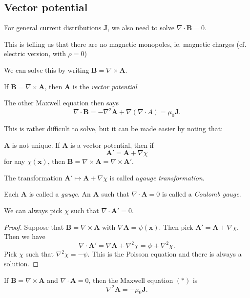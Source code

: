 \documentclass[a4paper]{article}
\begin{document}
\subsection{Vector potential}
For general current distributions $\mathbf{J}$, we also need to solve $\nabla \cdot \mathbf{B} = 0$.

This is telling us that there are no magnetic monopoles, ie. magnetic charges (cf. electric version, with $\rho = 0$)

We can solve this by writing $\mathbf{B} = \nabla \times \mathbf{A}$.
\begin{defi}
  If $\mathbf{B} = \nabla\times \mathbf{A}$, then $\mathbf{A}$ is the \emph{vector potential}.
\end{defi}
The other Maxwell equation then says
\[
  \nabla \cdot \mathbf{B} = -\nabla^2 \mathbf{A} + \nabla(\nabla\cdot A) = \mu_0 \mathbf{J}.\tag{$*$}
\]

This is rather difficult to solve, but it can be made easier by noting that:
\begin{prop}
  $\mathbf{A}$ is not unique. If $\mathbf{A}$ is a vector potential, then if 
  \[
    \mathbf{A}' = \mathbf{A} + \nabla \chi
  \]
  for any $\chi(\mathbf{x})$, then $\mathbf{B} = \nabla \times \mathbf{A} = \nabla\times \mathbf{A}'$.

  The transformation $\mathbf{A}' \mapsto \mathbf{A} + \nabla\chi$ is called a\emph{gauge transformation}.
\end{prop}

\begin{defi}
  Each $\mathbf{A}$ is called a \emph{gauge}. An $\mathbf{A}$ such that $\nabla \cdot \mathbf{A} = 0$ is called a \emph{Coulomb gauge}.
\end{defi}
\begin{prop}
  We can always pick $\chi$ such that $\nabla \cdot \mathbf{A}' = 0$.
\end{prop}

\begin{proof}
  Suppose that $\mathbf{B} = \nabla \times \mathbf{A}$ with $\nabla \mathbf{A} = \psi(\mathbf{x})$. Then pick $\mathbf{A}' = \mathbf{A} + \nabla \chi$. Then we have
  \[
    \nabla \cdot \mathbf{A}' = \nabla \mathbf{A} + \nabla^2 \chi = \psi + \nabla^2\chi.
  \]
  Pick $\chi$ such that $\nabla^2\chi = -\psi$. This is the Poisson equation and there is always a solution.
\end{proof}

If $\mathbf{B} = \nabla\times \mathbf{A}$ and $\nabla\cdot \mathbf{A} = 0$, then the Maxwell equation  $(*)$ is
\[
  \nabla^2 \mathbf{A} = -\mu_0 \mathbf{J}.
\]
\end{document}
